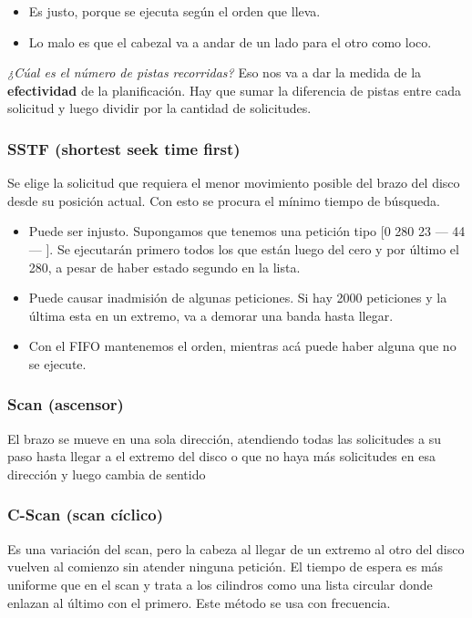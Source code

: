 \documentclass[10pt,a4paper]{article}
\begin{document}
\begin{itemize}
\item Es justo, porque se ejecuta según el orden que lleva.
\item Lo malo es que el cabezal va a andar de un lado para el otro como loco.
\end{itemize}

\textit{¿Cúal es el número de pistas recorridas?} Eso nos va a dar la medida de la \textbf{efectividad} de la planificación. Hay que sumar la diferencia de pistas entre cada solicitud y luego dividir por la cantidad de solicitudes.

\subsubsection{SSTF (shortest seek time first)}
Se elige la solicitud que requiera el menor movimiento posible del brazo del disco desde su posición actual. Con esto se procura el mínimo tiempo de búsqueda.

\begin{itemize}
\item Puede ser injusto. Supongamos que tenemos una petición tipo [0 280 23 --- 44 --- ]. Se ejecutarán primero todos los que están luego del cero y por último el 280, a pesar de haber estado segundo en la lista.
\item Puede causar inadmisión de algunas peticiones. Si hay 2000 peticiones y la última esta en un extremo, va a demorar una banda hasta llegar.
\item Con el FIFO mantenemos el orden, mientras acá puede haber alguna que no se ejecute.
\end{itemize}

\subsubsection{Scan (ascensor)}
El brazo se mueve en una sola dirección, atendiendo todas las solicitudes a su paso hasta llegar a el extremo del disco o que no haya más solicitudes en esa dirección y luego cambia de sentido

\subsubsection{C-Scan (scan cíclico)}
Es una variación del scan, pero la cabeza al llegar de un extremo al otro del disco vuelven al comienzo sin atender ninguna petición. El tiempo de espera es más uniforme que en el scan y trata a los cilindros como una lista circular donde enlazan al último con el primero. Este método se usa con frecuencia.
\end{document}
